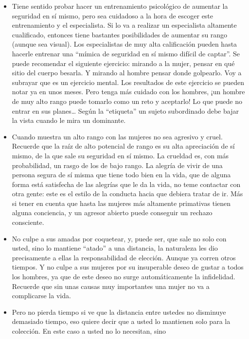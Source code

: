 \begin{itemize}

\item
  Tiene sentido probar hacer un entrenamiento psicológico de aumentar la
  seguridad en sí mismo, pero sea cuidadoso a la hora de escoger este
  entrenamiento y el especialista. Si lo va a realizar un especialista
  altamente cualificado, entonces tiene bastantes posibilidades de
  aumentar su rango (aunque sea visual). Los especialistas de muy alta
  calificación pueden hasta hacerle entrenar una ``mímica de seguridad
  en sí mismo difícil de captar''. Se puede recomendar el siguiente
  ejercicio: mirando a la mujer, pensar en qué sitio del cuerpo besarla.
  Y mirando al hombre pensar donde golpearlo. Voy a subrayar que es un
  ejercicio mental. Los resultados de este ejercicio se pueden notar ya
  en unos meses. Pero tenga más cuidado con los hombres, ¡un hombre de
  muy alto rango puede tomarlo como un reto y aceptarlo! Lo que puede no
  entrar en sus planes\ldots{} Según la ``etiqueta'' un sujeto
  subordinado debe bajar la vista cuando le mira un dominante.
\item
  Cuando muestra un alto rango con las mujeres no sea agresivo y cruel.
  Recuerde que la raíz de alto potencial de rango es su alta apreciación
  de sí mismo, de la que sale su seguridad en sí mismo. La crueldad es,
  con más probabilidad, un rasgo de los de bajo rango. La alegría de
  vivir de una persona segura de sí misma que tiene todo bien en la
  vida, que de alguna forma está satisfecha de las alegrías que le da la
  vida, no teme contactar con otra gente: este es el estilo de la
  conducta hacia que debiera tratar de ir. Más si tener en cuenta que
  hasta las mujeres más altamente primativas tienen alguna conciencia, y
  un agresor abierto puede conseguir un rechazo consciente.
\item
  No culpe a sus amadas por coquetear, y, puede ser, que sale no solo
  con usted, sino lo mantiene ``atado'' a una distancia, la naturaleza
  les dio precisamente a ellas la responsabilidad de elección. Aunque ya
  corren otros tiempos. Y no culpe a sus mujeres por su insuperable
  deseo de gustar a todos los hombres, ya que de este deseo no surge
  automáticamente la infidelidad. Recuerde que sin unas causas muy
  importantes una mujer no va a complicarse la vida.
\item
  Pero no pierda tiempo si ve que la distancia entre ustedes no
  disminuye demasiado tiempo, eso quiere decir que a usted lo mantienen
  solo para la colección. En este caso a usted no lo necesitan, sino

\end{itemize}
